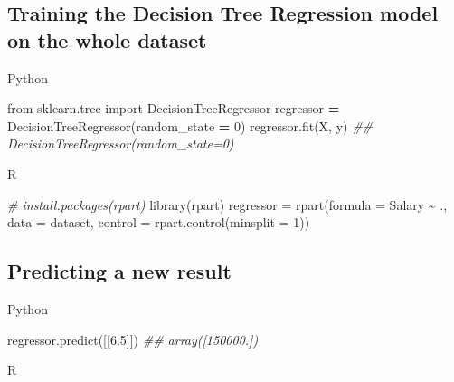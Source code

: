 \documentclass[
]{book}
\newenvironment{Shaded}{\begin{snugshade}}{\end{snugshade}}
\newcommand{\AttributeTok}[1]{\textcolor[rgb]{0.77,0.63,0.00}{#1}}
\newcommand{\CommentTok}[1]{\textcolor[rgb]{0.56,0.35,0.01}{\textit{#1}}}
\newcommand{\DecValTok}[1]{\textcolor[rgb]{0.00,0.00,0.81}{#1}}
\newcommand{\FloatTok}[1]{\textcolor[rgb]{0.00,0.00,0.81}{#1}}
\newcommand{\FunctionTok}[1]{\textcolor[rgb]{0.00,0.00,0.00}{#1}}
\newcommand{\ImportTok}[1]{#1}
\newcommand{\NormalTok}[1]{#1}
\newcommand{\OperatorTok}[1]{\textcolor[rgb]{0.81,0.36,0.00}{\textbf{#1}}}
\newcommand{\OtherTok}[1]{\textcolor[rgb]{0.56,0.35,0.01}{#1}}
\newcommand{\SpecialCharTok}[1]{\textcolor[rgb]{0.00,0.00,0.00}{#1}}
\theoremstyle{definition}
\theoremstyle{definition}
\theoremstyle{definition}
\theoremstyle{definition}
\theoremstyle{remark}
\begin{document}
\hypertarget{training-the-decision-tree-regression-model-on-the-whole-dataset}{%
\subsection{Training the Decision Tree Regression model on the whole dataset}\label{training-the-decision-tree-regression-model-on-the-whole-dataset}}

Python

\begin{Shaded}
\begin{Highlighting}[]
\ImportTok{from}\NormalTok{ sklearn.tree }\ImportTok{import}\NormalTok{ DecisionTreeRegressor}
\NormalTok{regressor }\OperatorTok{=}\NormalTok{ DecisionTreeRegressor(random\_state }\OperatorTok{=} \DecValTok{0}\NormalTok{)}
\NormalTok{regressor.fit(X, y)}
\CommentTok{\#\# DecisionTreeRegressor(random\_state=0)}
\end{Highlighting}
\end{Shaded}

R

\begin{Shaded}
\begin{Highlighting}[]
\CommentTok{\# install.packages(\textquotesingle{}rpart\textquotesingle{})}
\FunctionTok{library}\NormalTok{(rpart)}
\NormalTok{regressor }\OtherTok{=} \FunctionTok{rpart}\NormalTok{(}\AttributeTok{formula =}\NormalTok{ Salary }\SpecialCharTok{\textasciitilde{}}\NormalTok{ .,}
                  \AttributeTok{data =}\NormalTok{ dataset,}
                  \AttributeTok{control =} \FunctionTok{rpart.control}\NormalTok{(}\AttributeTok{minsplit =} \DecValTok{1}\NormalTok{))}
\end{Highlighting}
\end{Shaded}

\hypertarget{predicting-a-new-result-1}{%
\subsection{Predicting a new result}\label{predicting-a-new-result-1}}

Python

\begin{Shaded}
\begin{Highlighting}[]
\NormalTok{regressor.predict([[}\FloatTok{6.5}\NormalTok{]])}
\CommentTok{\#\# array([150000.])}
\end{Highlighting}
\end{Shaded}

R
\end{document}
